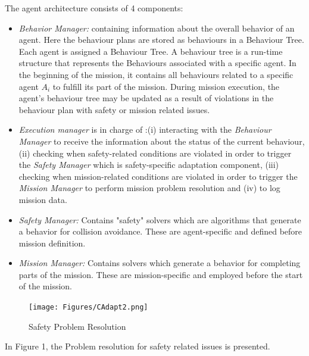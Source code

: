 \documentclass[journal]{IEEEtran}
\theoremstyle{definition}
\newcommand\patrizio[1]{\nb{Patrizio}{#1}}
\begin{document}
The agent architecture consists of 4 components:
\begin{itemize}
    \item \textit{Behavior Manager:} containing information about the overall behavior of an agent. Here the behaviour plans are stored as behaviours in a Behaviour Tree. Each agent is assigned a Behaviour Tree. A behaviour tree is a run-time structure that represents the Behaviours associated with a specific agent. In the beginning of the mission, it contains all behaviours related to a specific agent $A_i$ to fulfill its part of the mission. During mission execution, the agent's behaviour tree may be updated as a result of violations in the behaviour plan with safety or mission related issues.
    \item \textit{Execution manager} is in charge of :(i) interacting with the \textit{Behaviour Manager} to receive the information about the status of the current behaviour, (ii) checking when safety-related conditions are violated in order to trigger the \textit{Safety Manager} which is safety-specific adaptation component, (iii) checking when mission-related conditions are violated in order to trigger the \textit{Mission Manager} to perform mission problem resolution and (iv) to log mission data.
    \item \textit{Safety Manager:} Contains "safety" solvers which are algorithms that generate a behavior for collision avoidance. These are agent-specific and defined before mission definition.
    \item \textit{Mission Manager:} Contains solvers which generate a behavior for completing parts of the mission. These are mission-specific and employed  before the start of the mission.  
\end{itemize}



\begin{figure}[h]
\texttt{[image: Figures/CAdapt2.png]}
\caption{Safety Problem Resolution\patrizio{unreadable}}
\end{figure}







In Figure 1, the Problem resolution for safety related issues is presented.
\end{document}
